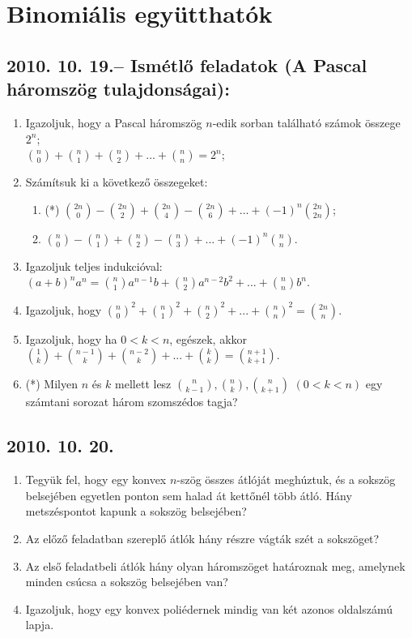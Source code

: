 \documentclass{article}
\newenvironment{abc}{\begin{enumerate}[label=\textit{\alph*})]}{\end{enumerate}}
\begin{document}
\section*{Binomiális együtthatók}

\subsection*{2010. 10. 19.-- Ismétlő feladatok (A Pascal háromszög tulajdonságai):}
\begin{enumerate}
\item Igazoljuk, hogy a Pascal háromszög $n$-edik sorban található számok összege $2^{n}$;
\\ $\binom{n}{0}+\binom{n}{1}+\binom{n}{2}+...+\binom{n}{n}=2^{n}$;
\item Számítsuk ki a következő összegeket:
	\begin{abc}
    	\item(*) $\binom{2n}{0}-\binom{2n}{2}+\binom{2n}{4}-\binom{2n}{6}+...+(-1)^{n}\binom{2n}{2n}$;
        \item $\binom{n}{0}-\binom{n}{1}+\binom{n}{2}-\binom{n}{3}+...+(-1)^{n}\binom{n}{n}$.
    \end{abc}
\item Igazoljuk teljes indukcióval: $(a+b)^{n}a^{n}=\binom{n}{1}a^{n-1}b+\binom{n}{2}a^{n-2}b^{2}+...+\binom{n}{n}b^{n}$.
\item Igazoljuk, hogy  $\binom{n}{0}^{2}+\binom{n}{1}^{2}+\binom{n}{2}^{2}+...+\binom{n}{n}^{2}=\binom{2n}{n}$.
\item Igazoljuk, hogy ha $0<k<n$, egészek, akkor $\binom{1}{k}+\binom{n-1}{k}+\binom{n-2}{k}+...+\binom{k}{k}=\binom{n+1}{k+1}$.
\item (*) Milyen $n$ és $k$ mellett lesz $\binom{n}{k-1}, \binom{n}{k}, \binom{n}{k+1}$ $(0<k<n)$ egy számtani sorozat három szomszédos tagja?
\end{enumerate}


\subsection*{2010. 10. 20.}
\begin{enumerate}
\item Tegyük fel, hogy egy konvex $n$-szög összes átlóját meghúztuk, és a sokszög belsejében egyetlen ponton sem halad át kettőnél több átló. Hány metszéspontot kapunk a sokszög belsejében?
\item Az előző feladatban szereplő átlók hány részre vágták szét a sokszöget?
\item Az első feladatbeli átlók hány olyan háromszöget határoznak meg, amelynek minden csúcsa a sokszög belsejében van?
\item Igazoljuk, hogy egy konvex poliédernek  mindig van két azonos oldalszámú lapja.
\end{enumerate}
\end{document}
